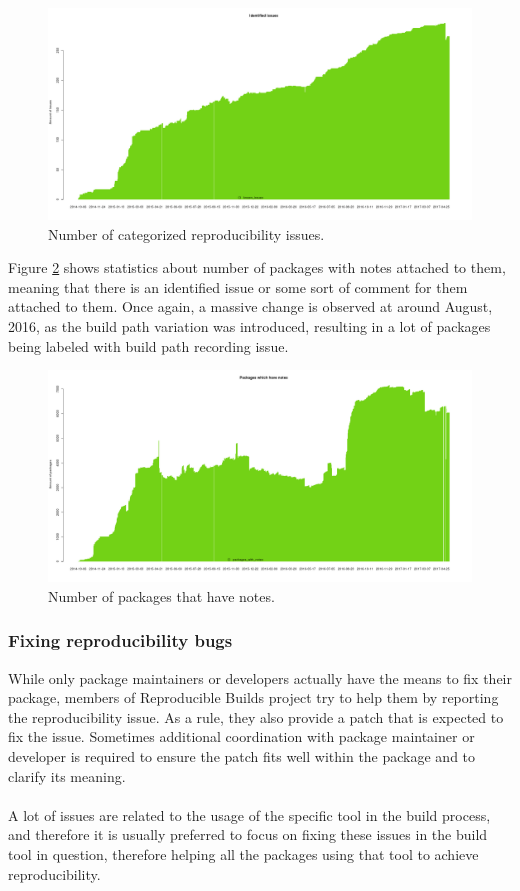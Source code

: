 {\begin{figure}
\centering
\includegraphics[width=1.0\textwidth]{fig/stats_issues.png}
\caption{\label{fig:stats_issues}Number of categorized reproducibility issues.}
\end{figure}

Figure \ref{fig:stats_notes} shows statistics about number of packages with notes attached to them, meaning that there is an identified issue or some sort of comment for them attached to them. Once again, a massive change is observed at around August, 2016, as the build path variation was introduced, resulting in a lot of packages being labeled with build path recording issue.\\

\begin{figure}
\centering
\includegraphics[width=1.0\textwidth]{fig/stats_notes.png}
\caption{\label{fig:stats_notes}Number of packages that have notes.}
\end{figure}
\subsubsection[Fixing reproducibility bugs]{Fixing reproducibility bugs}
While only package maintainers or developers actually have the means to fix their package, members of Reproducible Builds project try to help them by reporting the reproducibility issue. As a rule, they also provide a patch that is expected to fix the issue. Sometimes additional coordination with package maintainer or developer is required to ensure the patch fits well within the package and to clarify its meaning.\\\\
A lot of issues are related to the usage of the specific tool in the build process, and therefore it is usually preferred to focus on fixing these issues in the build tool in question, therefore helping all the packages using that tool to achieve reproducibility.

}
